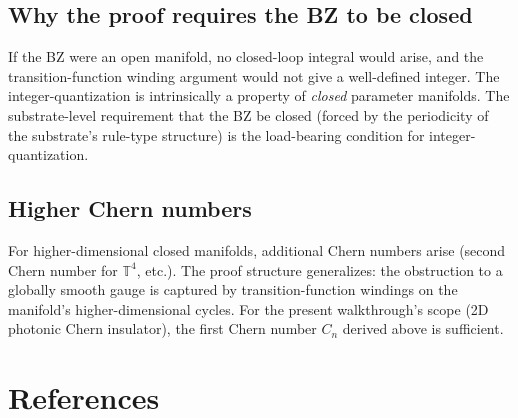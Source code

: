 \documentclass[11pt,a4paper]{article}
\begin{document}
\subsection{Why the proof requires the BZ to be closed}

If the BZ were an open manifold, no closed-loop integral would arise, and the transition-function winding argument would not give a well-defined integer. The integer-quantization is intrinsically a property of \emph{closed} parameter manifolds. The substrate-level requirement that the BZ be closed (forced by the periodicity of the substrate's rule-type structure) is the load-bearing condition for integer-quantization.

\subsection{Higher Chern numbers}

For higher-dimensional closed manifolds, additional Chern numbers arise (second Chern number for $\mathbb{T}^4$, etc.). The proof structure generalizes: the obstruction to a globally smooth gauge is captured by transition-function windings on the manifold's higher-dimensional cycles. For the present walkthrough's scope (2D photonic Chern insulator), the first Chern number $C_n$ derived above is sufficient.

\section*{References}
\end{document}
